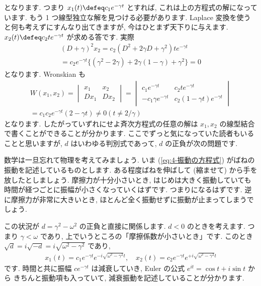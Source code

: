\documentclass[openany, a4paper, oneside]{jsbook}
\begin{document}
となります.
つまり $x_1 (t) \defeq c_1 e^{- \gamma t}$ とすれば, これは上の方程式の解になっています.
もう 1 つ線型独立な解を見つける必要があります.
Laplace 変換を使うと何も考えずにすんなり出てきますが, 今はひとまず天下りに与えます.
$x_2 (t) \defeq c_2 t e^{- \gamma t}$ が求める答です.
実際
\begin{gather}
( D + \gamma ) ^2 x_2
=
c_2 ( D^2 + 2 \gamma D + \gamma ^2 ) t e^{- \gamma t} \\
=
c_2 e^{- \gamma t }\{ ( \gamma ^2 - 2 \gamma ) +  2 \gamma ( 1 - \gamma ) + \gamma ^2   \}
=
0
\end{gather}
となります.
Wronskian も
\begin{gather}
W (x_1, x_2)
=
\begin{vmatrix}
x_1 & x_2 \\
Dx_1 & Dx_2
\end{vmatrix}
=
\begin{vmatrix}
c_1 e^{ - \gamma t} & c_2 t e^{ - \gamma t} \\
-c_1 \gamma e^{ - \gamma t} & c_2 ( 1 - \gamma t ) e^{ - \gamma t}
\end{vmatrix} \\
=
c_1 c_2 e^{ - \gamma t} ( 2 - \gamma t )
\not=
0 (t\not = 2 / \gamma )
\end{gather}
となります.
したがっていずれにせよ斉次方程式の任意の解は $x_1,x_2$ の線型結合で書くことができることが分かります.
ここでずっと気になっていた読者もいることと思いますが,  $d$ はいわゆる判別式であって,
$d$ の正負が次の問題です.

数学は一旦忘れて物理を考えてみましょう.
いま (\ref{eq:4-振動の方程式}) がばねの振動を記述しているものとします.
ある程度ばねを伸ばして (縮ませて) から手を放したとしましょう.
摩擦力が十分小さいとき, はじめは大きく振動していても時間が経つごとに振幅が小さくなっていくはずです.
つまりになるはずです.
逆に摩擦力が非常に大きいとき, ほとんど全く振動せずに振動が止まってしまうでしょう.

この状況が $d = \gamma ^2 - \omega ^2$ の正負と直接に関係します.
$d<0$ のときを考えます.
つまり $\gamma < \omega$ であり, 上でいうところの「摩擦係数が小さいとき」です.
このとき $\sqrt{d} = i \sqrt{-d} = i \sqrt{\omega ^2 - \gamma ^2}$ であり,
\begin{gather}
x_1 (t)
=
c_1 e^{- \gamma t } e^{ - i \sqrt{\omega ^2 - \gamma ^2} t}
, \quad
x_2 (t)
=
c_2 e^{- \gamma t } e^{ + i \sqrt{\omega ^2 - \gamma ^2} t }
\end{gather}
です.
時間と共に振幅 $c e^{- \gamma t}$ は減衰していき,
Euler の公式 $e^{it}= \cos t + i \sin t$ から
きちんと振動項も入っていて,
減衰振動を記述していることが分かります.
\end{document}
